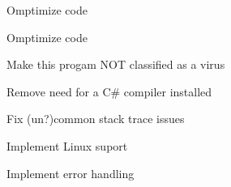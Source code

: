 
\begin{DoxyRefList}
\item[\label{todo__todo000001}%
\hypertarget{todo__todo000001}{}%
File \hyperlink{_event_interface_8cs}{Event\+Interface.cs} ]Omptimize code 
\item[\label{todo__todo000002}%
\hypertarget{todo__todo000002}{}%
File \hyperlink{_event_master_8cs}{Event\+Master.cs} ]Omptimize code 

Make this progam N\+OT classified as a virus 

Remove need for a C\# compiler installed 

Fix (un?)common stack trace issues 

Implement Linux suport 

Implement error handling
\end{DoxyRefList}